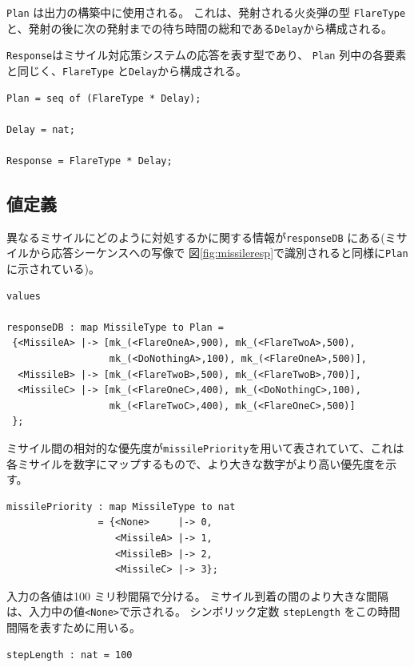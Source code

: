 \documentclass[\pformat,12pt]{jreport}
\begin{document}
\texttt{Plan} は出力の構築中に使用される。
これは、発射される火炎弾の型 \texttt{FlareType} と、発射の後に次の発射までの待ち時間の総和である\texttt{Delay}から構成される。

\texttt{Response}はミサイル対応策システムの応答を表す型であり、 \texttt{Plan} 列中の各要素と同じく、\texttt{FlareType} と\texttt{Delay}から構成される。

\begin{lstlisting}
Plan = seq of (FlareType * Delay);

Delay = nat;

Response = FlareType * Delay;
\end{lstlisting}

\subsection{値定義}

異なるミサイルにどのように対処するかに関する情報が\texttt{responseDB} にある(ミサイルから応答シーケンスへの写像で 図\ref{fig:missileresp}で識別されると同様に\texttt{Plan} に示されている)。

\begin{lstlisting}
values

responseDB : map MissileType to Plan =
 {<MissileA> |-> [mk_(<FlareOneA>,900), mk_(<FlareTwoA>,500),
                  mk_(<DoNothingA>,100), mk_(<FlareOneA>,500)],
  <MissileB> |-> [mk_(<FlareTwoB>,500), mk_(<FlareTwoB>,700)],
  <MissileC> |-> [mk_(<FlareOneC>,400), mk_(<DoNothingC>,100),
                  mk_(<FlareTwoC>,400), mk_(<FlareOneC>,500)]
 };
\end{lstlisting}

ミサイル間の相対的な優先度が\texttt{missilePriority}を用いて表されていて、これは各ミサイルを数字にマップするもので、より大きな数字がより高い優先度を示す。

\begin{lstlisting}
missilePriority : map MissileType to nat
                = {<None>     |-> 0,
                   <MissileA> |-> 1,
                   <MissileB> |-> 2,
                   <MissileC> |-> 3};
\end{lstlisting}

入力の各値は100 ミリ秒間隔で分ける。
ミサイル到着の間のより大きな間隔は、入力中の値\texttt{<None>}で示される。
シンボリック定数 \texttt{stepLength} をこの時間間隔を表すために用いる。

\begin{lstlisting}
stepLength : nat = 100
\end{lstlisting}
\end{document}
